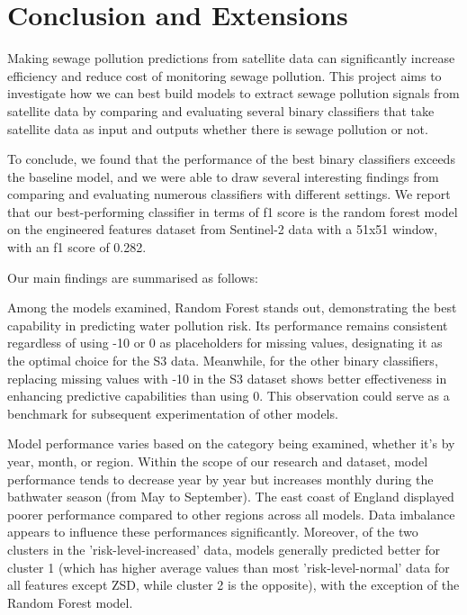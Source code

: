 \documentclass[a4paper,11pt]{report}
\begin{document}
\chapter{Conclusion and Extensions}

Making sewage pollution predictions from satellite data can significantly increase efficiency and reduce cost of monitoring sewage pollution. This project aims to investigate how we can best build models to extract sewage pollution signals from satellite data by comparing and evaluating several binary classifiers that take satellite data as input and outputs whether there is sewage pollution or not. 

To conclude, we found that the performance of the best binary classifiers exceeds the baseline model, and we were able to draw several interesting findings from comparing and evaluating numerous classifiers with different settings. We report that our best-performing classifier in terms of f1 score is the random forest model on the engineered features dataset from Sentinel-2 data with a 51x51 window, with an f1 score of 0.282. 

Our main findings are summarised as follows: 

Among the models examined, Random Forest stands out, demonstrating the best capability in predicting water pollution risk. Its performance remains consistent regardless of using -10 or 0 as placeholders for missing values, designating it as the optimal choice for the S3 data. Meanwhile, for the other binary classifiers, replacing missing values with -10 in the S3 dataset shows better effectiveness in enhancing predictive capabilities than using 0. This observation could serve as a benchmark for subsequent experimentation of other models.

Model performance varies based on the category being examined, whether it's by year, month, or region. Within the scope of our research and dataset, model performance tends to decrease year by year but increases monthly during the bathwater season (from May to September). The east coast of England displayed poorer performance compared to other regions across all models. Data imbalance appears to influence these performances significantly. Moreover, of the two clusters in the 'risk-level-increased' data, models generally predicted better for cluster 1 (which has higher average values than most 'risk-level-normal' data for all features except ZSD, while cluster 2 is the opposite), with the exception of the Random Forest model.
\end{document}
